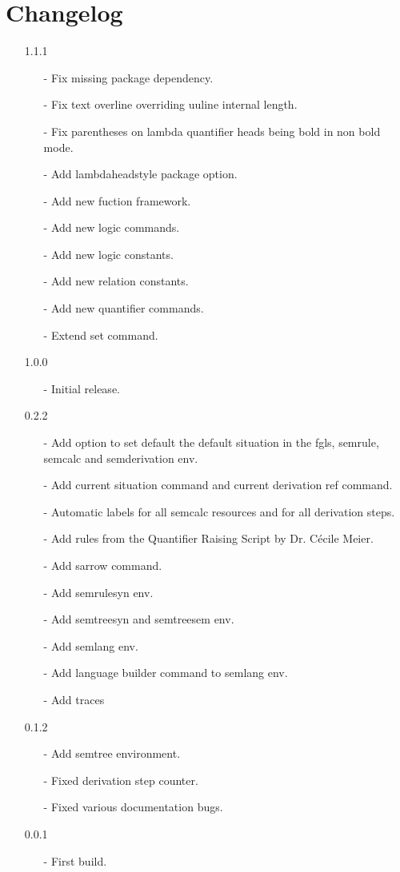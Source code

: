 \documentclass[10pt, a4paper]{article}
\begin{document}
	\section{Changelog}
	\begin{itemize}
		\item[1.1.1] 
				\begin{enumerate}
					\item[-] Fix missing package dependency.
					\item[-] Fix text overline overriding uuline internal length.
					\item[-] Fix parentheses on lambda quantifier heads being bold in non bold mode.
					\item[-] Add lambdaheadstyle package option.
					\item[-] Add new fuction framework.
					\item[-] Add new logic commands.
					\item[-] Add new logic constants.
					\item[-] Add new relation constants.
					\item[-] Add new quantifier commands.
					\item[-] Extend set command.
				\end{enumerate}
		\item[1.0.0] 
		\begin{enumerate}
			\item[-] Initial release.
		\end{enumerate}
		\item[0.2.2] 
		\begin{enumerate}
			\item[-] Add option to set default the default situation in the fgls, semrule, semcalc and semderivation env.
			\item[-] Add current situation command and current derivation ref command.
			\item[-] Automatic labels for all semcalc resources and for all derivation steps.
			\item[-] Add rules from the Quantifier Raising Script by Dr. C\'{e}cile Meier.
			\item[-] Add sarrow command.
			\item[-] Add semrulesyn env.
			\item[-] Add semtreesyn and semtreesem env.
			\item[-] Add semlang env.
			\item[-] Add language builder command to semlang env.
			\item[-] Add traces
		\end{enumerate}
		\item[0.1.2] 
		\begin{enumerate}
			\item[-] Add semtree environment.
			\item[-] Fixed derivation step counter.
			\item[-] Fixed various documentation bugs.
		\end{enumerate}
		\item[0.0.1] 
		\begin{enumerate}
			\item[-] First build.
		\end{enumerate}
	\end{itemize}
\end{document}
